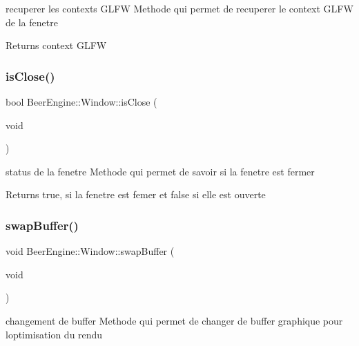 recuperer les contexts G\+L\+FW Methode qui permet de recuperer le context G\+L\+FW de la fenetre 

\begin{DoxyReturn}{Returns}
context G\+L\+FW 
\end{DoxyReturn}
\mbox{\label{class_beer_engine_1_1_window_a5b29d76b11e9f7457a92e6465939b71d}} 
\subsubsection{\texorpdfstring{is\+Close()}{isClose()}}
{\footnotesize\ttfamily bool Beer\+Engine\+::\+Window\+::is\+Close (\begin{DoxyParamCaption}\item[{void}]{ }\end{DoxyParamCaption})}



status de la fenetre Methode qui permet de savoir si la fenetre est fermer 

\begin{DoxyReturn}{Returns}
true, si la fenetre est femer et false si elle est ouverte 
\end{DoxyReturn}
\mbox{\label{class_beer_engine_1_1_window_a3b2c31a149ed0b90ac292d88f87fd369}} 
\subsubsection{\texorpdfstring{swap\+Buffer()}{swapBuffer()}}
{\footnotesize\ttfamily void Beer\+Engine\+::\+Window\+::swap\+Buffer (\begin{DoxyParamCaption}\item[{void}]{ }\end{DoxyParamCaption})}



changement de buffer Methode qui permet de changer de buffer graphique pour l\textquotesingle{}optimisation du rendu 

\mbox{\label{class_beer_engine_1_1_window_abc6524b9b96a88e3427dce738bfe9d4a}} 
